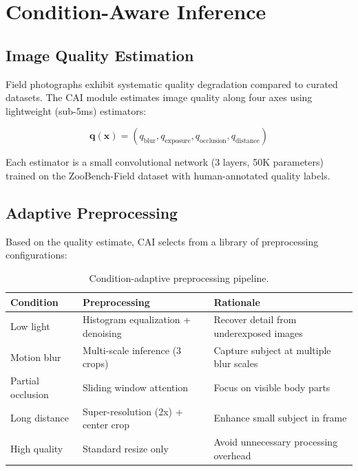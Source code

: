 \documentclass[11pt,a4paper]{article}
\begin{document}
\section{Condition-Aware Inference}
\label{sec:condition}

\subsection{Image Quality Estimation}

Field photographs exhibit systematic quality degradation compared to curated datasets.
The CAI module estimates image quality along four axes using lightweight (sub-5ms) estimators:

\begin{equation}
    \mathbf{q}(\mathbf{x}) = (q_{\text{blur}}, q_{\text{exposure}}, q_{\text{occlusion}}, q_{\text{distance}})
\end{equation}

Each estimator is a small convolutional network (3 layers, 50K parameters) trained on the ZooBench-Field dataset with human-annotated quality labels.

\subsection{Adaptive Preprocessing}

Based on the quality estimate, CAI selects from a library of preprocessing configurations:

\begin{table}[H]
\centering
\caption{Condition-adaptive preprocessing pipeline.}
\label{tab:preprocessing}
\begin{tabularx}{\textwidth}{@{}llX@{}}
\toprule
\textbf{Condition} & \textbf{Preprocessing} & \textbf{Rationale} \\
\midrule
Low light & Histogram equalization + denoising & Recover detail from underexposed images \\
Motion blur & Multi-scale inference (3 crops) & Capture subject at multiple blur scales \\
Partial occlusion & Sliding window attention & Focus on visible body parts \\
Long distance & Super-resolution (2x) + center crop & Enhance small subject in frame \\
High quality & Standard resize only & Avoid unnecessary processing overhead \\
\bottomrule
\end{tabularx}
\end{table}
\end{document}

